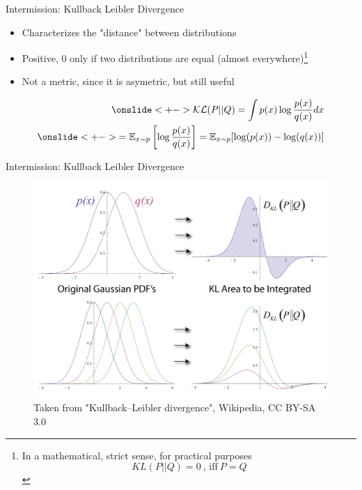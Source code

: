 \documentclass[10pt,aspectratio=169]{beamer}
\begin{document}
\begin{frame}{Intermission: Kullback Leibler Divergence}
    \begin{itemize}[<+->]
        \item Characterizes the "distance" between distributions
        \item Positive, 0 only if two distributions are equal (almost everywhere)\footnote{In a mathematical, strict sense, for practical purposes $$KL(P||Q)  = 0~\text{, iff}~ P = Q$$}
        \item Not a metric, since it is asymetric, but still useful
    \end{itemize}
    \begin{align*}
        \onslide<+->{\mathcal{KL}(P||Q) = \int p(x) \log\frac{p(x)}{q(x)}dx}\\
        \onslide<+->{= \mathbb{E}_{x\sim p}\left[\log\frac{p(x)}{q(x)}\right] = \mathbb{E}_{x\sim p}[\log(p(x)) - \log(q(x))]}
    \end{align*}
\end{frame}

\begin{frame}{Intermission: Kullback Leibler Divergence}
    \begin{center}
        \begin{figure}
            \includegraphics[height=0.8\textheight]{figs/kl.png}
            \caption{Taken from "Kullback–Leibler divergence", Wikipedia, CC BY-SA 3.0}
        \end{figure}
    \end{center}
\end{frame}
\end{document}

